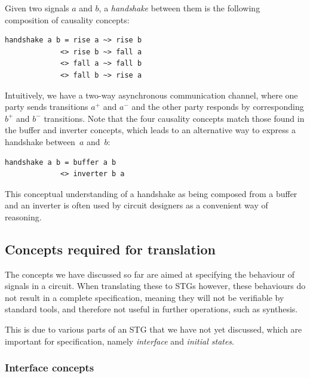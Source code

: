 \documentclass[british,conference,compsoc]{IEEEtran}
\begin{document}
Given two signals $a$ and $b$, a \emph{handshake} between them is
the following composition of causality concepts:

\begin{verbatim}
handshake a b = rise a ~> rise b 
             <> rise b ~> fall a 
             <> fall a ~> fall b 
             <> fall b ~> rise a
\end{verbatim}

Intuitively, we have a two-way asynchronous communication channel,
where one party sends transitions $a^{+}$ and $a^{-}$ and the other
party responds by corresponding $b^{+}$ and $b^{-}$ transitions.
Note that the four causality concepts match those found
in the buffer and inverter concepts, which leads to an alternative
way to express a handshake between~$a$ and~$b$:

\begin{verbatim}
handshake a b = buffer a b 
             <> inverter b a
\end{verbatim}

This conceptual understanding of a handshake as being composed
from a buffer and an inverter is often used by circuit designers as
a convenient way of reasoning.

\vspace{-2mm}

\subsection{Concepts required for translation\label{sub:trans-concepts}}

\vspace{-2mm}

The concepts we have discussed so far are aimed at specifying the behaviour of 
signals in a circuit. When translating these to STGs however, these behaviours 
do not result in a complete specification, meaning they will not be 
verifiable by standard tools, and therefore not useful in further operations, 
such as synthesis.

This is due to various parts of an STG that we have not yet discussed, which 
are important for specification, namely \emph{interface} and 
\emph{initial states}.

\vspace{-3mm}

\subsubsection{Interface concepts\label{sub:interface}} 
\end{document}
